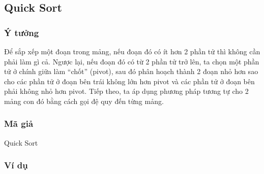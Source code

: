 \subsection{Quick Sort}

\subsubsection{Ý tưởng}

Để sắp xếp một đoạn trong mảng, nếu đoạn đó có ít hơn 2 phần tử thì không cần phải làm gì cả. Ngược lại, nếu đoạn đó có từ 2 phần tử trở lên, ta chọn một phần tử ở chính giữa làm “chốt” (pivot), sau đó phân hoạch thành 2 đoạn nhỏ hơn sao cho các phần tử ở đoạn bên trái không lớn hơn pivot và các phần tử ở đoạn bên phải không nhỏ hơn pivot. Tiếp theo, ta áp dụng phương pháp tương tự cho 2 mảng con đó bằng cách gọi đệ quy đến từng mảng. \cite[p.~93--94]{hoang2008}

\subsubsection{Mã giả}

\begin{algorithm}[H]
\caption{Quick Sort \cite{code-quick}}
\label{quick-sort}

\end{algorithm}

\subsubsection{Ví dụ}

